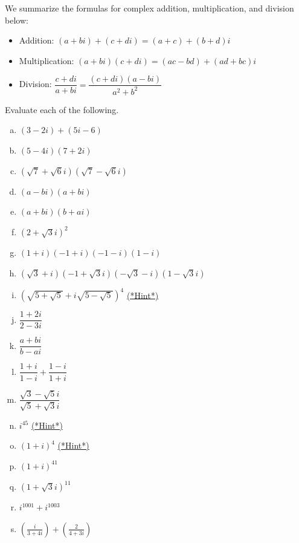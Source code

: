 We summarize the formulas for complex addition, multiplication, and division below:
\begin{itemize}

\item
Addition:  $(a+bi)+(c+di) = (a+c)+(b+d)i$

\item
Multiplication:  $(a+bi)(c+di) = (ac-bd)+(ad+bc)i$

\item
Division:  $\dfrac{c+di}{a+bi} = \dfrac{(c+di)(a-bi)}{a^2+b^2}$
\end{itemize}

\begin{exercise}{9}
Evaluate each of the following.
\begin{multicols}{2}
\begin{enumerate}[(a)]
\item
$(3-2i)+ (5i-6)$
\item
$(5-4i)(7+2i)$
\item
$(\sqrt{7} + \sqrt{6}i)(\sqrt{7} - \sqrt{6}i)$
\item
$(a - bi)(a + bi)$
\item
$(a + bi)(b + ai)$
\item
$(2 + \sqrt{3}i)^2$
\item
$(1+i)(-1+i)(-1-i)(1-i)$
\item
$(\sqrt{3}+i)(-1+ \sqrt{3}i)(-\sqrt{3}-i)(1 -\sqrt{3}i)$
\item
$\left(\sqrt{5 + \sqrt{5}} + i\sqrt{5 - \sqrt{5}}\right)^4$
\hyperref[sec:complex:hints]{(*Hint*)}
\item
$\dfrac{1+2i}{2-3i}$
\item
$\dfrac{a+bi}{b-ai}$
\item
$\dfrac{1+i}{1-i} + \dfrac{1-i}{1+i}$
\item
$\dfrac{\sqrt{3} - \sqrt{5}i}{\sqrt{5} + \sqrt{3}i}$
 \item
$i^{45}$
\hyperref[sec:complex:hints]{(*Hint*)}
\item
$(1 + i)^4$  
\hyperref[sec:complex:hints]{(*Hint*)}
\item
$(1 + i)^{41}$
\item
$(1 + \sqrt{3}i)^{11}$
\item
$i^{1001} + i^{1003}$
\item
$\left(\frac{i}{3 + 4i} \right) +  \left(\frac{2}{4 + 3i} \right) $
\end{enumerate}
\end{multicols}
\end{exercise}

